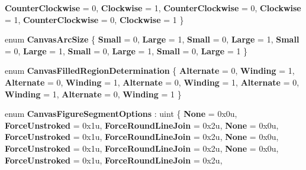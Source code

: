 \begin{DoxyCompactItemize}
\newline
{\bfseries Counter\+Clockwise} = 0, 
{\bfseries Clockwise} = 1, 
{\bfseries Counter\+Clockwise} = 0, 
{\bfseries Clockwise} = 1, 
\newline
{\bfseries Counter\+Clockwise} = 0, 
{\bfseries Clockwise} = 1
 \}
\item 
\mbox{\label{namespace_microsoft_1_1_graphics_1_1_canvas_1_1_geometry_a583cc3265f037d53e69808d04a785d9a}} 
enum {\bfseries Canvas\+Arc\+Size} \{ \newline
{\bfseries Small} = 0, 
{\bfseries Large} = 1, 
{\bfseries Small} = 0, 
{\bfseries Large} = 1, 
\newline
{\bfseries Small} = 0, 
{\bfseries Large} = 1, 
{\bfseries Small} = 0, 
{\bfseries Large} = 1, 
\newline
{\bfseries Small} = 0, 
{\bfseries Large} = 1
 \}
\item 
\mbox{\label{namespace_microsoft_1_1_graphics_1_1_canvas_1_1_geometry_af9fb7e1db5b8bf2c9334f51491270043}} 
enum {\bfseries Canvas\+Filled\+Region\+Determination} \{ \newline
{\bfseries Alternate} = 0, 
{\bfseries Winding} = 1, 
{\bfseries Alternate} = 0, 
{\bfseries Winding} = 1, 
\newline
{\bfseries Alternate} = 0, 
{\bfseries Winding} = 1, 
{\bfseries Alternate} = 0, 
{\bfseries Winding} = 1, 
\newline
{\bfseries Alternate} = 0, 
{\bfseries Winding} = 1
 \}
\item 
\mbox{\label{namespace_microsoft_1_1_graphics_1_1_canvas_1_1_geometry_ada89e04bb167c7a96061368c1d6cc2ab}} 
enum {\bfseries Canvas\+Figure\+Segment\+Options} \+: uint \{ \newline
{\bfseries None} = 0x0u, 
{\bfseries Force\+Unstroked} = 0x1u, 
{\bfseries Force\+Round\+Line\+Join} = 0x2u, 
{\bfseries None} = 0x0u, 
\newline
{\bfseries Force\+Unstroked} = 0x1u, 
{\bfseries Force\+Round\+Line\+Join} = 0x2u, 
{\bfseries None} = 0x0u, 
{\bfseries Force\+Unstroked} = 0x1u, 
\newline
{\bfseries Force\+Round\+Line\+Join} = 0x2u, 
{\bfseries None} = 0x0u, 
{\bfseries Force\+Unstroked} = 0x1u, 
{\bfseries Force\+Round\+Line\+Join} = 0x2u, 

\end{DoxyCompactItemize}
